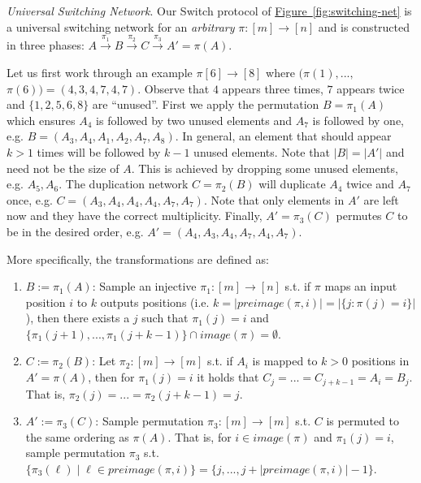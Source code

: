 \documentclass[11pt,letterpaper]{article}
\newcommand{\namedref}[2]{\hyperref[#2]{#1~\ref*{#2}}}
\newcommand{\figureref}[1]{\namedref{Figure}{#1}}
\renewcommand{\paragraph}[1]{\vspace{0.1cm}\noindent\emph{#1}.}
\begin{document}
\paragraph{Universal Switching Network}\label{sec:switch}
Our Switch protocol of \figureref{fig:switching-net} is a universal switching network for an \emph{arbitrary}  $\pi : [m]\rightarrow [n]$ and is constructed in three phases\cite{MS13}:
 $A\overset{\pi_1}{\rightarrow}B\overset{\pi_2}{\rightarrow}C\overset{\pi_3}{\rightarrow}A'=\pi(A)$. 
 
 Let us first work through an example $\pi[6]\rightarrow[8]$ where $(\pi(1),...,$ $\pi(6))=(4,3,4,7,4,7)$. Observe that $4$ appears three times, $7$ appears twice and $\{1,2,5,6,8\}$ are ``unused''. First we apply the permutation $B=\pi_1(A)$ which ensures $A_4$ is followed by two unused elements and $A_7$ is followed by one, e.g. $B=(A_3,A_4,A_1,A_2,A_7,A_8)$. In general, an element that should appear $k>1$ times will be followed by $k-1$ unused elements. Note that $|B|=|A'|$ and need not be the size of $A$. This is achieved by dropping some unused elements, e.g. $A_5,A_6$. The duplication network $C=\pi_2(B)$ will duplicate $A_4$ twice and $A_7$ once, e.g. $C=(A_3,A_4,A_4,A_4,A_7,A_7)$. Note that only elements in $A'$ are left now and they have the correct multiplicity. Finally, $A'=\pi_3(C)$ permutes $C$ to be in the desired order, e.g. $A'=(A_4,A_3,A_4,A_7,A_4,A_7)$.
 
More specifically, the transformations are defined as:
\begin{enumerate}
	\item $B:=\pi_1(A)$: Sample an injective $\pi_1:[m]\rightarrow[n]$ s.t. if $\pi$ maps an input position $i$ to $k$ outputs positions (i.e. $k=|preimage(\pi,i)|=|\{ j : \pi(j)=i \}|$), then there exists a $j$ such that $\pi_1(j)=i$  and $\{\pi_1(j+ 1),...,\pi_1(j +k-1)\} \cap image(\pi) = \emptyset$. 
	
	\item $C:=\pi_2(B)$: Let $\pi_2:[m]\rightarrow[m]$ s.t. if $A_i$ is mapped to $k>0$ positions in $A'=\pi(A)$, then for $\pi_1(j)=i$ it holds that $ C_{j}=...=C_{j+k-1} = A_i=B_j$. That is, $\pi_2(j)=...=\pi_2(j+k-1)=j$.
	
	\item $A':=\pi_3(C)$: Sample permutation $\pi_3:[m]\rightarrow[m]$  s.t. $C$ is permuted to the same ordering as $\pi(A)$. That is, for $i\in image(\pi)$ and $\pi_1(j)=i$, sample permutation $\pi_3$ s.t. $\{\pi_3(\ell)\mid \ell\in preimage(\pi,i)\} =\{j,...,j+| preimage(\pi,i)|-1\}$.
	
\end{enumerate}
\end{document}
